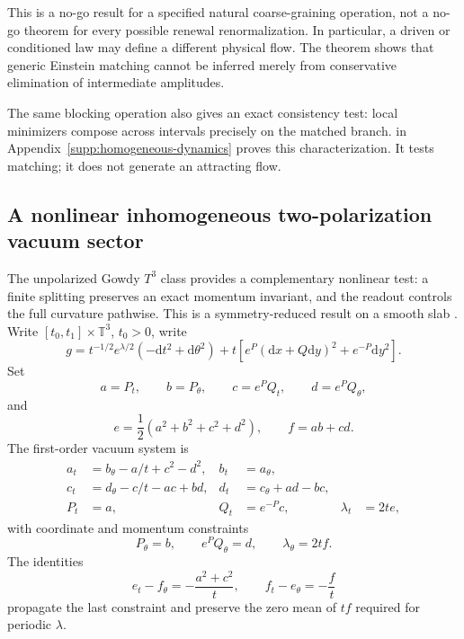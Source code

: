 \documentclass[11pt]{article}
\numberwithin{equation}{section}
\theoremstyle{definition}
\theoremstyle{remark}
\newcommand{\dd}{\mathrm d}
\begin{document}
This is a no-go result for a specified natural coarse-graining operation, not a
no-go theorem for every possible renewal renormalization.  In particular, a
driven or conditioned law may define a different physical flow.  The theorem
shows that generic Einstein matching cannot be inferred merely from conservative
elimination of intermediate amplitudes.

The same blocking operation also gives an exact consistency test:
local minimizers compose across intervals precisely on the matched branch.
 in
Appendix~\ref{supp:homogeneous-dynamics} proves this characterization.
It tests matching; it does not generate an attracting flow.
\subsection{A nonlinear inhomogeneous two-polarization vacuum sector}
\label{subsec:gowdy-main}

The unpolarized Gowdy $T^3$ class provides a complementary nonlinear test:
a finite splitting preserves an exact momentum invariant, and the readout
controls the full curvature pathwise. This is a symmetry-reduced result
on a smooth slab \cite{Moncrief1981}. Write
$[t_0,t_1]\times\mathbb T^3$, $t_0>0$, write
\begin{equation}
 g=t^{-1/2}e^{\lambda/2}(-\dd t^2+\dd\theta^2)
 +t\left[e^P(\dd x+Q\dd y)^2+e^{-P}\dd y^2\right].
 \label{eq:main-gowdy-metric}
\end{equation}
Set
\begin{equation}
 a=P_t,\qquad b=P_\theta,\qquad
 c=e^P Q_t,\qquad d=e^P Q_\theta,
 \label{eq:main-gowdy-frame-vars}
\end{equation}
and
\begin{equation}
 e=\frac12(a^2+b^2+c^2+d^2),\qquad f=ab+cd.
 \label{eq:main-gowdy-ef}
\end{equation}
The first-order vacuum system is
\begin{align}
 a_t&=b_\theta-a/t+c^2-d^2, & b_t&=a_\theta,\nonumber\\
 c_t&=d_\theta-c/t-ac+bd, & d_t&=c_\theta+ad-bc,\nonumber\\
 P_t&=a, & Q_t&=e^{-P}c, & \lambda_t&=2te,
 \label{eq:main-gowdy-frame-system}
\end{align}
with coordinate and momentum constraints
\begin{equation}
 P_\theta=b,\qquad e^P Q_\theta=d,\qquad
 \lambda_\theta=2tf.
 \label{eq:main-gowdy-constraints}
\end{equation}
The identities
\begin{equation}
 e_t-f_\theta=-\frac{a^2+c^2}{t},\qquad
 f_t-e_\theta=-\frac ft
 \label{eq:main-gowdy-stress-identities}
\end{equation}
propagate the last constraint and preserve the zero mean of $tf$ required for
periodic $\lambda$.
\end{document}
